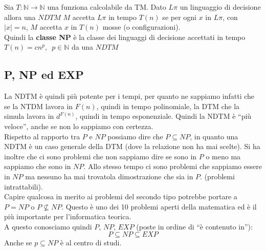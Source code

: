 \begin{definizione}
	Sia $T:\mathbb{N}\to\mathbb{N}$ una funziona calcolabile da TM. Dato $L\pi$ un
	linguaggio di decisione allora una $NDTM$ $M$ accetta $L\pi$ in tempo
	$T(n)$ se per ogni $x$ in $L\pi$, con $|x|=n$,  $M$ accetta $x$ in $T(n)$
	mosse (o configurazioni).\\
	Quindi la \textbf{classe NP} è la classe dei linguaggi di decisione accettati
	in tempo $T(n)=cn^p,\,\,\,p\in \mathbb{N}$ da una $NDTM$
\end{definizione}
\subsection{P, NP ed EXP}
La NDTM è quindi più potente per i tempi, per quanto ne sappiamo infatti che se
la NTDM lavora in $F(n)$, quindi in tempo polinomiale, la DTM che la simula
lavora in $d^{F(n)}$, quindi in tempo esponenziale. Quindi la NDTM è ``più
veloce'', anche se non lo sappiamo con certezza.\\
Rispetto al rapporto tra $P$ e $NP$ possiamo dire che $P\subseteq NP$, in quanto
una NDTM è un caso generale della DTM (dove la relazione non ha mai scelte). Si
ha inoltre che ci sono problemi che non sappiamo dire se sono in $P$ o meno ma sappiamo che sono in $NP$. Allo stesso tempo ci sono problemi che sappiamo essere in $NP$ ma nessuno ha mai trovatola dimostrazione che sia in $P$. (problemi intrattabili).\\
Capire qualcosa in merito ai problemi del secondo tipo potrebbe portare a $P=NP$
o $P\not\subseteq NP$. Questo è uno dei 10 problemi aperti della matematica ed è
il più importante per l'informatica teorica.\\
A questo conosciamo quindi $P$, $NP$, $EXP$ (poste in ordine di ``è contenuto
in''):
\[P\subseteq NP \subseteq EXP\]
Anche se $p\subseteq NP$ è al centro di studi.\\
